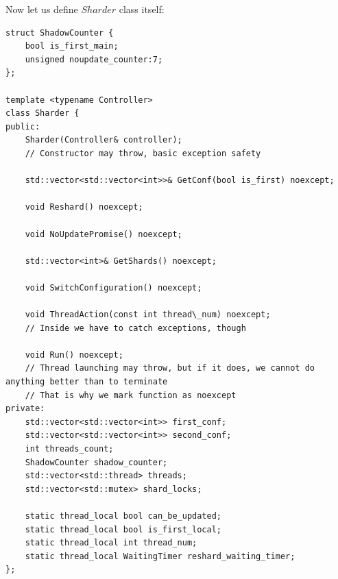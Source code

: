 \documentclass{article}
\begin{document}
Now let us define $Sharder$ class itself:
\begin{lstlisting}
struct ShadowCounter {
	bool is_first_main;
	unsigned noupdate_counter:7;
};

template <typename Controller>
class Sharder {
public:
	Sharder(Controller& controller);
	// Constructor may throw, basic exception safety

	std::vector<std::vector<int>>& GetConf(bool is_first) noexcept;

	void Reshard() noexcept;

	void NoUpdatePromise() noexcept;

	std::vector<int>& GetShards() noexcept;

	void SwitchConfiguration() noexcept;

	void ThreadAction(const int thread\_num) noexcept;
	// Inside we have to catch exceptions, though

	void Run() noexcept;
	// Thread launching may throw, but if it does, we cannot do anything better than to terminate
	// That is why we mark function as noexcept
private:
	std::vector<std::vector<int>> first_conf;
	std::vector<std::vector<int>> second_conf;
	int threads_count;
	ShadowCounter shadow_counter;
	std::vector<std::thread> threads;
	std::vector<std::mutex> shard_locks;

	static thread_local bool can_be_updated;
	static thread_local bool is_first_local;
	static thread_local int thread_num;
	static thread_local WaitingTimer reshard_waiting_timer;
};
\end{lstlisting}
\end{document}
